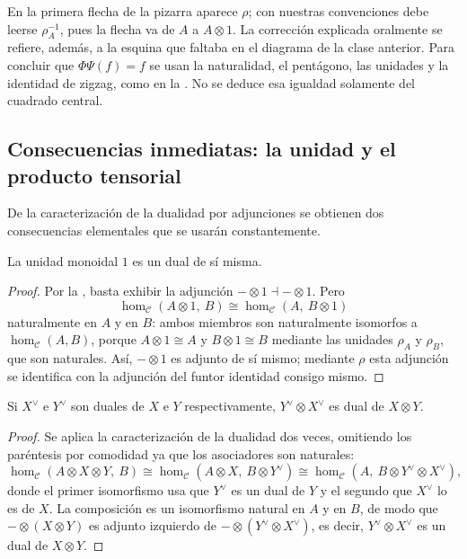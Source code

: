 \begin{nota}
En la primera flecha de la pizarra aparece $\rho$; con nuestras convenciones debe leerse $\rho_A^{-1}$, pues la flecha va de $A$ a $A\otimes1$. La corrección explicada oralmente se refiere, además, a la esquina que faltaba en el diagrama de la clase anterior. Para concluir que $\Phi\Psi(f)=f$ se usan la naturalidad, el pentágono, las unidades y la identidad de zigzag, como en la . No se deduce esa igualdad solamente del cuadrado central.
\end{nota}


\subsection{Consecuencias inmediatas: la unidad y el producto tensorial}

De la caracterización de la dualidad por adjunciones se obtienen dos consecuencias elementales que se usarán constantemente.

\begin{coro}\label{coro:unidad-autodual}
La unidad monoidal $1$ es un dual de sí misma.
\end{coro}
\begin{proof}
Por la , basta exhibir la adjunción $-\otimes1\dashv-\otimes1$. Pero
\[
\hom_{\mathcal C}(A\otimes1,\ B)\cong\hom_{\mathcal C}(A,\ B\otimes1)
\]
naturalmente en $A$ y en $B$: ambos miembros son naturalmente isomorfos a $\hom_{\mathcal C}(A,B)$, porque $A\otimes1\cong A$ y $B\otimes1\cong B$ mediante las unidades $\rho_A$ y $\rho_B$, que son naturales. Así, $-\otimes1$ es adjunto de sí mismo; mediante $\rho$ esta adjunción se identifica con la adjunción del funtor identidad consigo mismo.
\end{proof}

\begin{coro}\label{coro:dual-tensor}
Si $X^\vee$ e $Y^\vee$ son duales de $X$ e $Y$ respectivamente, $Y^\vee\otimes X^\vee$ es dual de $X\otimes Y$.
\end{coro}
\begin{proof}
Se aplica la caracterización de la dualidad dos veces, omitiendo los paréntesis por comodidad ya que los asociadores son naturales:
\[
\hom_{\mathcal C}(A\otimes X\otimes Y,\ B)
\cong\hom_{\mathcal C}(A\otimes X,\ B\otimes Y^\vee)
\cong\hom_{\mathcal C}(A,\ B\otimes Y^\vee\otimes X^\vee),
\]
donde el primer isomorfismo usa que $Y^\vee$ es un dual de $Y$ y el segundo que $X^\vee$ lo es de $X$. La composición es un isomorfismo natural en $A$ y en $B$, de modo que $-\otimes(X\otimes Y)$ es adjunto izquierdo de $-\otimes(Y^\vee\otimes X^\vee)$, es decir, $Y^\vee\otimes X^\vee$ es un dual de $X\otimes Y$.
\end{proof}

